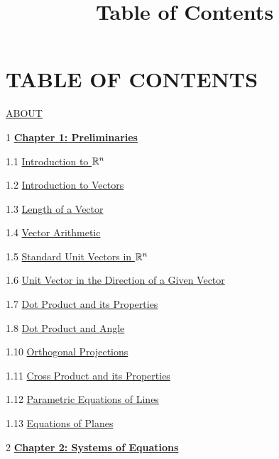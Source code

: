 \documentclass{ximera}
\title{Table of Contents} \license{CC BY-NC-SA 4.0}
\begin{document}
\begin{abstract}
\end{abstract}
\maketitle

\section{TABLE OF CONTENTS}
	
	\href{https://ximera.osu.edu/oerlinalg/LinearAlgebra/ABOUT/main}{ABOUT}
	
1	\href{https://ximera.osu.edu/oerlinalg/LinearAlgebra/XLAChapter_prelim/main}{\textbf{Chapter 1: Preliminaries}}
	
1.1	\href{https://ximera.osu.edu/oerlinalg/LinearAlgebra/RRN-0010/main}{Introduction to $\mathbb{R}^n$}
	
1.2	\href{https://ximera.osu.edu/oerlinalg/LinearAlgebra/VEC-0010/main}{Introduction to Vectors}
	
1.3	\href{https://ximera.osu.edu/oerlinalg/LinearAlgebra/VEC-0020/main}{Length of a Vector}
	
1.4	\href{https://ximera.osu.edu/oerlinalg/LinearAlgebra/VEC-0030/main}{Vector Arithmetic}
	
1.5	\href{https://ximera.osu.edu/oerlinalg/LinearAlgebra/VEC-0035/main}{Standard Unit Vectors in $\mathbb{R}^n$}
	
1.6	\href{https://ximera.osu.edu/oerlinalg/LinearAlgebra/VEC-0036/main}{Unit Vector in the Direction of a Given Vector}
	
1.7	\href{https://ximera.osu.edu/oerlinalg/LinearAlgebra/VEC-0050/main}{Dot Product and its Properties}
	
1.8	\href{https://ximera.osu.edu/oerlinalg/LinearAlgebra/VEC-0060/main}{Dot Product and Angle }
	
1.10	\href{https://ximera.osu.edu/oerlinalg/LinearAlgebra/VEC-0070/main}{Orthogonal Projections}
	
1.11	\href{https://ximera.osu.edu/oerlinalg/LinearAlgebra/VEC-0080/main}{Cross Product and its Properties}
	
1.12	\href{https://ximera.osu.edu/oerlinalg/LinearAlgebra/RRN-0020/main}{Parametric Equations of Lines}
	
1.13	\href{https://ximera.osu.edu/oerlinalg/LinearAlgebra/RRN-0030/main}{Equations of Planes}
	
2	\href{https://ximera.osu.edu/oerlinalg/LinearAlgebra/XLAChapter_systems/main}{\textbf{Chapter 2: Systems of Equations}}
	
\end{document}
